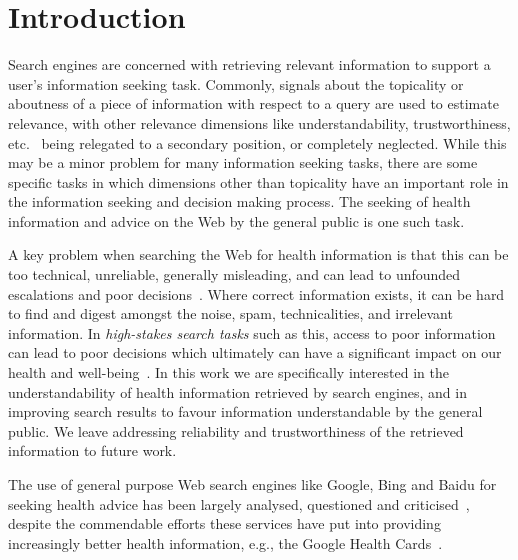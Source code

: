 \section*{Introduction} 
\label{chp:understanding_understandability}

Search engines are concerned with retrieving relevant information to support a user's information seeking task. Commonly, signals about the topicality or aboutness of a piece of information with respect to a query are used to estimate relevance, with other relevance dimensions like understandability, trustworthiness, etc.~\cite{zhang2014multidimensional} being relegated to a secondary position, or completely neglected. While this may be a minor problem for many information seeking tasks, there are some specific tasks in which dimensions other than topicality have an important role in the information seeking and decision making process. The seeking of health information and advice on the Web by the general public is one such task. 

A key problem when searching the Web for health information is that this can be too technical, unreliable, generally misleading, and can lead to unfounded escalations and poor decisions~\cite{white09b}. Where correct information exists, it can be hard to find and digest amongst the noise, spam, technicalities, and irrelevant information. In \textit{high-stakes search tasks} such as this, access to poor information can lead to poor decisions which ultimately can have a significant impact on our health and well-being~\cite{white09b,white13}. In this work we are specifically interested in the understandability of health information retrieved by search engines, and in improving search results to favour information understandable by the general public. We leave addressing reliability and trustworthiness of the retrieved information to future work.

The use of general purpose Web search engines like Google, Bing and Baidu for seeking health advice has been largely analysed, questioned and criticised~\cite{graber99,fitzsimmons10,wiener13,patel13,atcherson14,meillier17,ellimoottil12}, despite the commendable efforts these services have put into providing increasingly better health information, e.g., the Google Health Cards~\cite{gabrilovich2016cura}. 

